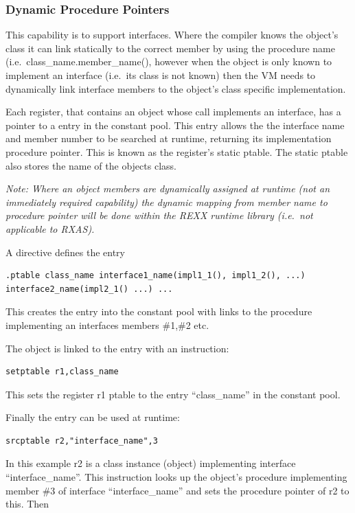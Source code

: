 \hypertarget{dynamic-procedure-pointers}{%
\subsubsection{Dynamic Procedure
Pointers}\label{dynamic-procedure-pointers}}

This capability is to support interfaces. Where the compiler knows the
object's class it can link statically to the correct member by using the
procedure name (i.e.~class\_name.member\_name(), however when the object
is only known to implement an interface (i.e.~its class is not known)
then the VM needs to dynamically link interface members to the object's
class specific implementation.

Each register, that contains an object whose call implements an
interface, has a pointer to a entry in the constant pool. This entry
allows the the interface name and member number to be searched at
runtime, returning its implementation procedure pointer. This is known
as the register's static ptable. The static ptable also stores the name
of the objects class.

\emph{Note: Where an object members are dynamically assigned at runtime
(not an immediately required capability) the dynamic mapping from member
name to procedure pointer will be done within the REXX runtime library
(i.e.~not applicable to RXAS).}

A directive defines the entry

\begin{verbatim}
.ptable class_name interface1_name(impl1_1(), impl1_2(), ...) interface2_name(impl2_1() ...) ...
\end{verbatim}

This creates the entry into the constant pool with links to the
procedure implementing an interfaces members \#1,\#2 etc.

The object is linked to the entry with an instruction:

\begin{verbatim}
setptable r1,class_name
\end{verbatim}

This sets the register r1 ptable to the entry ``class\_name'' in the
constant pool.

Finally the entry can be used at runtime:

\begin{verbatim}
srcptable r2,"interface_name",3
\end{verbatim}

In this example r2 is a class instance (object) implementing interface
``interface\_name''. This instruction looks up the object's procedure
implementing member \#3 of interface ``interface\_name'' and sets the
procedure pointer of r2 to this. Then

